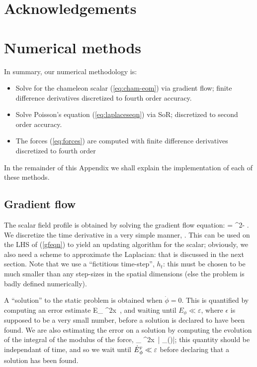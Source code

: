 \documentclass[a4paper, 12pt]{article}
\numberwithin{equation}{section}
\begin{document}

\section*{Acknowledgements}

\appendix
\section{Numerical methods}
\label{sec:nummethods}
In summary, our numerical methodology is:
\begin{itemize}
\item Solve for the chameleon scalar (\ref{eq:cham-eom}) via gradient flow; finite difference derivatives discretized to fourth order accuracy.
\item Solve Poisson's equation (\ref{eq:laplaceseqn}) via SoR; discretized to second order accuracy.
\item The forces (\ref{eq:forces}) are computed with finite difference derivatives discretized to fourth order
\end{itemize}
In the remainder of this Appendix we shall explain the implementation of each of these methods.

\subsection{Gradient flow}
The scalar field profile is obtained by solving the gradient flow equation:
\bea
\label{gfeqn}
\dot{\phi} = \nabla^2\phi - .
\eea
We discretize the time derivative in a very simple manner,
\bea
\dot{\phi} \approx {}.
\eea
This can be used on the LHS of (\ref{gfeqn}) to yield an updating algorithm for the scalar; obviously, we also need a scheme to approximate the Laplacian: that is discussed in the next section. Note that we use a ``fictitious time-step'', $h_t$: this must be chosen to be much smaller than any  step-sizes in the spatial dimensions (else the problem is badly defined numerically).

A ``solution'' to the static problem is obtained when $\dot{\phi}=0$. This is quantified by computing an error estimate
\bea
E_{\phi}  \int \dd^2x\, \dot{\phi},
\eea
and waiting until $E_{\phi}\ll \varepsilon$, where $\epsilon$ is supposed to be a very small number, before a solution is declared to have been found. We are also estimating the error on a solution by computing the evolution of the integral of the modulus of the force,
\bea
{}_{\phi}  \int \dd^2x\, \left| _{(\phi)}\right|;
\eea
this quantity should be independant of time, and so we wait until $\dot{E}{}^{\scriptscriptstyle{\textrm{F}}}_{\phi}\ll \varepsilon$ before declaring that a solution has been found.
\end{document}
